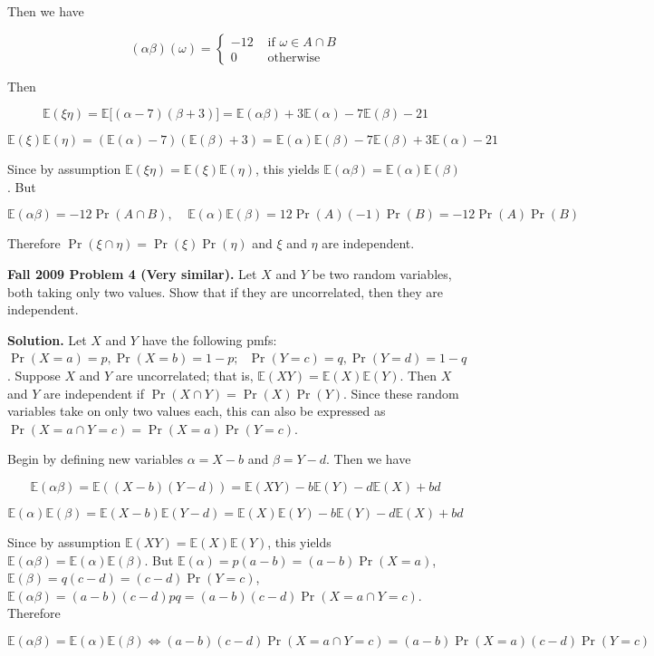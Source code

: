 \documentclass{article}
\newcommand{\E}{\mathbb{E}}
\begin{document}
Then we have

\[
(\alpha \beta)(\omega) = \begin{cases} 
      -12 & \text{ if } \omega \in A \cap B \\
      0 &  \text{ otherwise} 
   \end{cases}
\]

Then

\[
\E(\xi \eta) = \E\big[ (\alpha - 7)(\beta + 3)\big] = \E(\alpha \beta) + 3 \E(\alpha) - 7 \E(\beta) - 21
\]

\[
\E(\xi) \E(\eta) = (\E(\alpha) - 7) (\E(\beta) + 3) = \E(\alpha) \E(\beta) - 7 \E(\beta) + 3 \E(\alpha) - 21
\]

Since by assumption \( \E(\xi \eta)  = \E(\xi) \E(\eta) \), this yields \(\E(\alpha \beta) = \E(\alpha) \E(\beta) \). But

\[
\E(\alpha \beta) = -12 \Pr(A \cap B), \ \ \ \ \ \E(\alpha) \E(\beta) = 12 \Pr(A) (-1) \Pr(B) = -12\Pr(A)\Pr(B)
\]

Therefore \(\Pr(\xi \cap \eta) = \Pr(\xi) \Pr(\eta)\) and \(\xi\) and \(\eta\) are independent.

\textbf{Fall 2009 Problem 4 (Very similar).} Let \(X\) and \(Y\) be two random variables, both taking only two values. Show that if they are uncorrelated, then they are independent.

\textbf{Solution.} Let \(X\) and \(Y\) have the following pmfs: \(\Pr(X = a) = p, \Pr(X = b) = 1-p; \ \ \ \Pr(Y = c) = q, \Pr(Y = d) = 1  -q \). Suppose \(X\) and \(Y\) are uncorrelated; that is, \(\E(XY) = \E(X)\E(Y)\). Then \(X\) and \(Y\) are independent if \(\Pr(X \cap Y) = \Pr(X) \Pr(Y)\). Since these random variables take on only two values each, this can also be expressed as \( \Pr(X = a \cap Y = c) = \Pr(X = a) \Pr(Y = c)\). 

Begin by defining new variables \(\alpha = X - b\) and \(\beta = Y - d\). Then we have

\[
\E(\alpha \beta) = \E( (X - b)(Y - d)) = \E(XY) - b \E(Y) -d \E(X) + bd
\]

\[
\E(\alpha) \E(\beta) = \E(X-b) \E(Y - d) = \E(X)\E(Y) -b \E(Y) -d \E(X) + bd
\]

Since by assumption \(\E(XY) = \E(X)\E(Y)\), this yields \(\E(\alpha \beta)  = \E(\alpha) \E(\beta) \). But \(\E(\alpha) = p(a-b) = (a - b) \Pr(X = a)\), \(\E(\beta) = q(c-d) = (c -d) \Pr(Y = c)\), \(\E(\alpha \beta) = (a-b)(c-d)pq = (a - b)(c - d) \Pr(X = a \cap Y = c)\). Therefore

\[
\E(\alpha \beta)  = \E(\alpha) \E(\beta)  \iff  (a - b)(c - d) \Pr(X = a \cap Y = c) = (a - b) \Pr(X = a) (c -d) \Pr(Y = c)
\]
\end{document}
